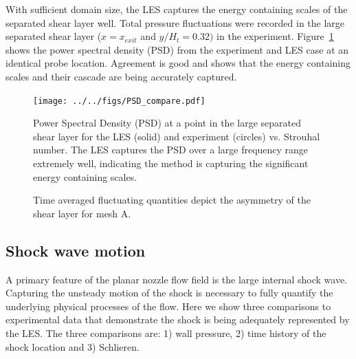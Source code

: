 \documentclass[]{aiaa-tc}%
\begin{document}

With sufficient domain size, the LES captures the energy containing scales of the separated shear layer well.  Total pressure fluctuations were recorded in the large separated shear layer ($x=x_{exit}$ and $y/H_t = 0.32)$ in the experiment.  Figure~\ref{fig:PSD_comp} shows the power spectral density (PSD) from the experiment and LES case at an identical probe location.  Agreement is good and shows that the energy containing scales and their cascade are being accurately captured.  


\begin{figure}
	\centering
	\texttt{[image: ../../figs/PSD\_compare.pdf]}
	\caption{ Power Spectral Density (PSD) at a point in the large separated shear layer for the LES (solid) and experiment (circles) vs. Strouhal number.  The LES captures the PSD over a large frequency range extremely well, indicating the method is capturing the significant energy containing scales.
 	\label{fig:PSD_comp}
	}
\end{figure}


\begin{figure}
	\hspace{-.65in}
	
	\hspace{-.65in}
	
	\centering
	\caption{ Time averaged fluctuating quantities depict the asymmetry of the shear layer for mesh A.
 	}
	\label{fig:RMS}
\end{figure}

\clearpage
\subsection{Shock wave motion}

A primary feature of the planar nozzle flow field is the large internal shock wave.  Capturing the unsteady motion of the shock is necessary to fully quantify the underlying physical processes of the flow.  Here we show three comparisons to experimental data that demonstrate the shock is being adequately represented by the LES.  The three comparisons are: 1) wall pressure, 2) time history of the shock location and 3) Schlieren.
\end{document}
